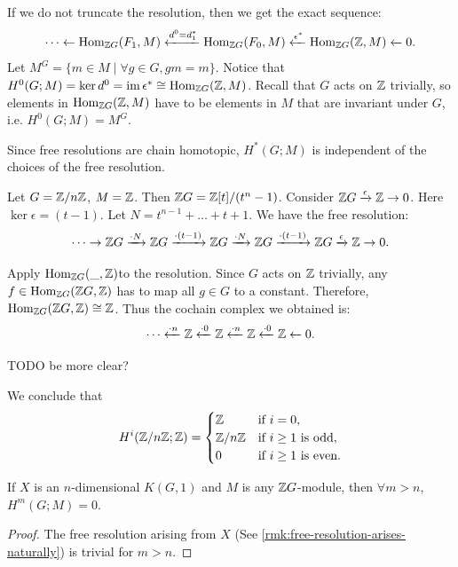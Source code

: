 If we do not truncate the resolution, then we get the exact sequence:
\[
    \cdots \leftarrow \Hom{F_1 }{M }{\Z G} \xleftarrow{d^0 =d_1^*} \Hom{F_0}{M }{\Z G} \xleftarrow{\epsilon^*} \Hom{\Z }{M }{\Z G} \xleftarrow{} 0.
\]
Let  \(M^G = \{m\in M \mid \forall g \in G, gm=m\}\). Notice that \(H^0(G;M)= \ker d^0 = \im \epsilon^* \cong \Hom{\Z }{M }{\Z G}\). Recall that \(G\) acts on \(\Z\) trivially, so elements in \(\Hom{\Z }{M }{\Z G}\) have to be elements in \(M\) that are invariant under \(G\), i.e. \(H^0(G;M) = M^G\).

Since free resolutions  are chain homotopic, \(H^*(G;M)\) is independent of the choices of the free resolution. 

\begin{example}[Cohomology of \(\Z/n\Z\)]
    \label{ex:cohomology-of-ZnZ}
    Let \(G=\Z/n\Z\), \(M=\Z\). Then \(\Z G = \Z[t]/(t^n-1)\). Consider \(\Z G \xrightarrow{\epsilon} \Z \to 0\). Here \(\ker \epsilon = (t-1)\). Let \(N = t^{n-1}+\dots + t + 1\). We have the free resolution:
    \[ 
        \cdots \to \Z G
        \xrightarrow{\cdot N }  \Z G 
        \xrightarrow{\cdot(t-1)} \Z G
        \xrightarrow{\cdot N }  \Z G 
        \xrightarrow{\cdot(t-1)}  \Z G 
        \xrightarrow{\epsilon} \Z \to 0.
    \]
\end{example}

Apply \(\Hom{\_ }{\Z }{\Z G}\)to the resolution. Since \(G\) acts on \(\Z\) trivially,  any  \(f\in \Hom{\Z G }{\Z }{\Z G}\) has to map all \(g \in G\) to a constant. Therefore, \(\Hom{\Z G }{\Z }{\Z G} \cong \Z\). Thus the cochain complex we obtained is:
\[
    \cdots \xleftarrow{\cdot n} \Z \xleftarrow{\cdot 0} \Z  \xleftarrow{\cdot n} \Z \xleftarrow{\cdot 0} \Z \leftarrow 0.
\]

TODO be more clear?

We conclude that 
\begin{equation*}
    H^i(\Z/n\Z;\Z) = 
    \begin{cases}
        \Z & \text{if } i=0 ,\\
        \Z/n\Z & \text{if } i\geq 1 \text{ is odd}, \\
        0 & \text{if } i\geq 1 \text{ is even}.
    \end{cases}
\end{equation*}

\begin{proposition}
    \label{prop:high-cohomology-zero}
    If \(X\) is an \(n\)-dimensional \(K(G,1)\) and \(M\) is any \(\Z G\)-module, then \(\forall m > n\), \(H^m(G;M) =0\).
\end{proposition}
\begin{proof}
    The free resolution arising from \(X\) (See \cref{rmk:free-resolution-arises-naturally}) is trivial for \(m>n\).
\end{proof}

